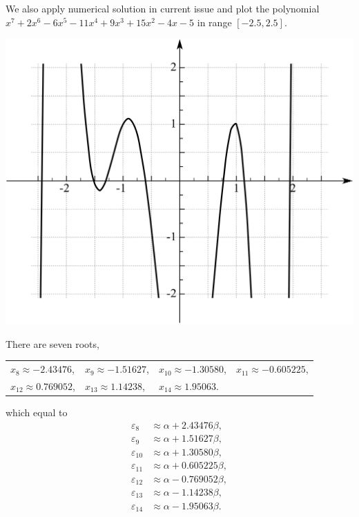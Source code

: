 \documentclass[a4paper]{book}
\begin{document}
\begin{solution}
\begin{enumerate}[label=(\alph*)]
		We also apply numerical solution in current issue and plot the polynomial $x^7 + 2x^6 - 6x^5 - 11x^4 + 9x^3 +15x^2 -4x -5$ in range $[-2.5, 2.5]$.
		
		\begin{center}
		\includegraphics[scale=1]{./structures/exercise_1/phenanthrene/996.png}
		\end{center}				
		There are seven roots,
		\begin{center}
		\begin{tabular}{llll}
			$x_8 \approx -2.43476$, & $x_9 \approx -1.51627$, & $x_{10} \approx -1.30580$, & $x_{11} \approx -0.605225 $, \\
			$x_{12} \approx 0.769052$, & $x_{13} \approx 1.14238$, & $x_{14} \approx 1.95063$. &
		\end{tabular}
		\end{center}
		which equal to	
		\begin{align}
			\varepsilon_8 &\approx \alpha + 2.43476 \beta , \\
			\varepsilon_9 &\approx \alpha + 1.51627 \beta , \\
			\varepsilon_{10} &\approx \alpha + 1.30580 \beta , \\
			\varepsilon_{11} &\approx \alpha + 0.605225 \beta , \\
			\varepsilon_{12} &\approx \alpha - 0.769052 \beta , \\
			\varepsilon_{13} &\approx \alpha - 1.14238 \beta , \\
			\varepsilon_{14} &\approx \alpha - 1.95063 \beta .
		\end{align}
		

\end{enumerate}
\end{solution}
\end{document}
